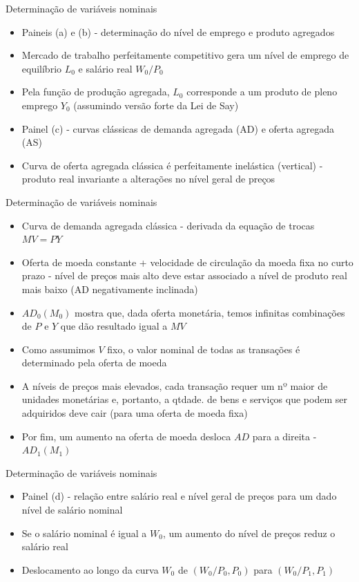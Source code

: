 \documentclass[10pt]{beamer}
\begin{document}
\begin{frame}
    {Determinação de variáveis nominais}
    \begin{itemize}
        \item Paineis (a) e (b) - determinação do nível de emprego e produto agregados\bigskip
        \item Mercado de trabalho perfeitamente competitivo gera um nível de emprego de equilíbrio $L_0$ e salário real $W_0/P_0$\bigskip
        \item Pela função de produção agregada, $L_0$ corresponde a um produto de pleno emprego $Y_0$ (assumindo versão forte da Lei de Say)\bigskip
        \item Painel (c) - curvas clássicas de demanda agregada (AD) e oferta agregada (AS)\bigskip
        \item Curva de oferta agregada clássica é perfeitamente inelástica (vertical) - produto real invariante a alterações no nível geral de preços
    \end{itemize}    
\end{frame}

\begin{frame}
    {Determinação de variáveis nominais}
    \begin{itemize}
        \item Curva de demanda agregada clássica - derivada da equação de trocas $MV = PY$\bigskip
        \item Oferta de moeda constante + velocidade de circulação da moeda fixa no curto prazo - nível de preços mais alto deve estar associado a nível de produto real mais baixo (AD negativamente inclinada)\bigskip
        \item $AD_0(M_0)$ mostra que, dada oferta monetária, temos infinitas combinações de $P$ e $Y$ que dão resultado igual a $MV$\bigskip
        \item Como assumimos $V$ fixo, o valor nominal de todas as transações é determinado pela oferta de moeda\bigskip
        \item A níveis de preços mais elevados, cada transação requer um nº maior de unidades monetárias e, portanto, a qtdade. de bens e serviços que podem ser adquiridos deve cair (para uma oferta de moeda fixa)\bigskip
        \item Por fim, um aumento na oferta de moeda desloca $AD$ para a direita - $AD_1(M_1)$
    \end{itemize}
\end{frame}

\begin{frame}
    {Determinação de variáveis nominais}
    \begin{itemize}
        \item Painel (d) - relação entre salário real e nível geral de preços para um dado nível de salário nominal\bigskip
        \item Se o salário nominal é igual a $W_0$, um aumento do nível de preços reduz o salário real\bigskip
        \item Deslocamento ao longo da curva $W_0$ de $(W_0/P_0, P_0)$ para $(W_0/P_1, P_1)$
    \end{itemize}
\end{frame}
\end{document}
